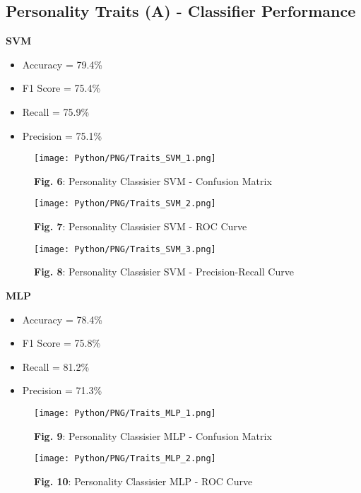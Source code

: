 \documentclass{article}
\begin{document}
\newpage


\subsection{Personality Traits (A) - Classifier Performance}

\textbf{SVM}
\begin{itemize}
    \item Accuracy = 79.4\%
    \item F1 Score = 75.4\%
    \item Recall = 75.9\%
    \item Precision = 75.1\%
\end{itemize}

\begin{figure}[!h]
    \centering
    \texttt{[image: Python/PNG/Traits\_SVM\_1.png]}
    \caption{\textbf{Fig. 6}: Personality Classisier SVM - Confusion Matrix}
\end{figure}
\vspace{1cm}
\begin{figure}[!h]
    \centering
    \texttt{[image: Python/PNG/Traits\_SVM\_2.png]}
    \caption{\textbf{Fig. 7}: Personality Classisier SVM - ROC Curve}
\end{figure}

\newpage

\begin{figure}[!h]
    \centering
    \texttt{[image: Python/PNG/Traits\_SVM\_3.png]}
    \caption{\textbf{Fig. 8}: Personality Classisier SVM - Precision-Recall Curve}
\end{figure}

\vspace{1cm}

\textbf{MLP}
\begin{itemize}
    \item Accuracy = 78.4\%
    \item F1 Score = 75.8\%
    \item Recall = 81.2\%
    \item Precision = 71.3\%
\end{itemize}

\begin{figure}[!h]
    \centering
    \texttt{[image: Python/PNG/Traits\_MLP\_1.png]}
    \caption{\textbf{Fig. 9}: Personality Classisier MLP - Confusion Matrix}
\end{figure}
\newpage
\begin{figure}[!h]
    \centering
    \texttt{[image: Python/PNG/Traits\_MLP\_2.png]}
    \caption{\textbf{Fig. 10}: Personality Classisier MLP - ROC Curve}
\end{figure}
\end{document}

